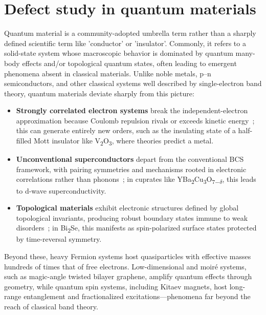 \section{Defect study in quantum materials}
Quantum material is a community-adopted umbrella term rather than a sharply defined scientific term like 'conductor' or 'insulator'. Commonly, it refers to a solid-state system whose macroscopic behavior is dominated by quantum many-body effects and/or topological quantum states, often leading to emergent phenomena absent in classical materials. Unlike noble metals, p–n semiconductors, and other classical systems well described by single-electron band theory, quantum materials deviate sharply from this picture:
\begin{itemize}
	\item \textbf{Strongly correlated electron systems} break the independent-electron approximation because Coulomb repulsion rivals or exceeds kinetic energy~\cite{hubbardElectronCorrelationsNarrow1963}; this can generate entirely new orders, such as the insulating state of a half-filled Mott insulator like V\textsubscript{2}O\textsubscript{3}, where theories predict a metal\cite{mcwhanMottTransitionCrDoped1969}\cite{mottMetalInsulatorTransition1968}\cite{mottMetalInsulatorTransitions1990}.
	\item \textbf{Unconventional superconductors} depart from the conventional BCS framework, with pairing symmetries and mechanisms rooted in electronic correlations rather than phonons~\cite{OutShadowBCS2006}; in cuprates like 
	YBa\textsubscript{2}Cu\textsubscript{3}O\textsubscript{7$-\delta$}, this leads to d-wave superconductivity\cite{tsueiPairingSymmetryFlux1994}\cite{hardyPrecisionMeasurementsTemperature1993}\cite{kirtleySymmetryOrderParameter1995}.
	\item \textbf{Topological materials} exhibit electronic structures defined by global topological invariants, producing robust boundary states immune to weak disorders~\cite{chiuClassificationTopologicalQuantum2016}; in Bi\textsubscript{2}Se, this manifests as spin-polarized surface states protected by time-reversal symmetry\cite{panElectronicStructureTopological2011}\cite{jozwiakSpinpolarizedSurfaceResonances2016}\cite{sobotaUltrafastElectronDynamics2014}.
\end{itemize}
Beyond these, heavy Fermion systems host quasiparticles with effective masses hundreds of times that of free electrons\cite{wirthExploringHeavyFermions2016}\cite{stewartHeavyfermionSystems1984}. Low-dimensional and moiré systems, such as magic-angle twisted bilayer graphene, amplify quantum effects through geometry\cite{caoUnconventionalSuperconductivityMagicangle2018}\cite{carrTwistronicsManipulatingElectronic2017}, while quantum spin systems, including Kitaev magnets, host long-range entanglement and fractionalized excitations\cite{normanHerbertsmithiteSearchQuantum2016}\cite{banejeeNeutronScatteringProximate2017}—phenomena far beyond the reach of classical band theory.  

